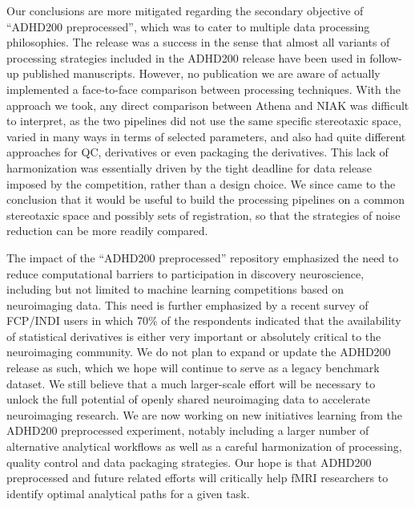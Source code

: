 \documentclass[preprint,12pt,3p]{elsarticle}
\begin{document}
Our conclusions are more mitigated regarding the secondary objective of ``ADHD200 preprocessed'', which was to cater to multiple data processing philosophies. The release was a success in the sense that almost all variants of processing strategies included in the ADHD200 release have been used in follow-up published manuscripts. However, no publication we are aware of actually implemented a face-to-face comparison between processing techniques. With the approach we took, any direct comparison between Athena and NIAK was difficult to interpret, as the two pipelines did not use the same specific stereotaxic space, varied in many ways in terms of selected parameters, and also had quite different approaches for QC, derivatives or even packaging the derivatives. This lack of harmonization was essentially driven by the tight deadline for data release imposed by the competition, rather than a design choice. We since came to the conclusion that it would be useful to build the processing pipelines on a common stereotaxic space and possibly sets of registration, so that the strategies of noise reduction can be more readily compared. 
\par 
The impact of the ``ADHD200 preprocessed'' repository emphasized the need to reduce computational barriers to participation in discovery neuroscience, including but not limited to machine learning competitions based on neuroimaging data. This need is further emphasized by a recent survey of FCP/INDI users in which 70\% of the respondents indicated that the availability of statistical derivatives is either very important or absolutely critical to the neuroimaging community. We do not plan to expand or update the ADHD200 release as such, which we hope will continue to serve as a legacy benchmark dataset. We still believe that a much larger-scale effort will be necessary to unlock the full potential of openly shared neuroimaging data to accelerate neuroimaging research. We are now working on new initiatives learning from the ADHD200 preprocessed experiment, notably including a larger number of alternative analytical workflows as well as a careful harmonization of processing, quality control and data packaging strategies. Our hope is that ADHD200 preprocessed and future related efforts will critically help fMRI researchers to identify optimal analytical paths for a given task. 





% 
% 
% 
% 
% 
% 
% 
% 
% 
% 
% 
% 


\end{document}
